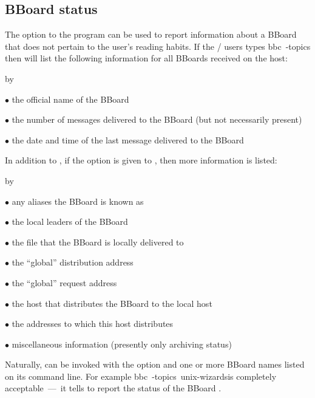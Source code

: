 \subsection{BBoard status}
The  option to the  program can be used to report
information about a BBoard that does not pertain to the user's reading habits.
If the \MH/ users types \example bbc\ -topics\endexample
then  will list the following information for all BBoards received
on the host:
\smallskip
{\advance\leftskip by\parindent
\item{$\bullet$} the official name of the BBoard
\item{$\bullet$} the number of messages delivered to the BBoard
(but not necessarily present)
\item{$\bullet$} the date and time of the last message delivered to the BBoard
\medskip}
\noindent
In addition to ,
if the  option is given to ,
then more information is listed:
\smallskip
{\advance\leftskip by\parindent
\item{$\bullet$} any aliases the BBoard is known as
\item{$\bullet$} the local leaders of the BBoard
\item{$\bullet$} the file that the BBoard is locally delivered to
\item{$\bullet$} the ``global'' distribution address
\item{$\bullet$} the ``global'' request address
\item{$\bullet$} the host that distributes the BBoard to the local host
\item{$\bullet$} the addresses to which this host distributes
\item{$\bullet$} miscellaneous information (presently only archiving status)
\medskip}
\noindent
Naturally,  can be invoked with the  option and one or
more BBoard names listed on its command line.
For example \example bbc\ -topics\ unix-wizards\endexample is completely
acceptable~---~it tells  to report the status of the BBoard
.

